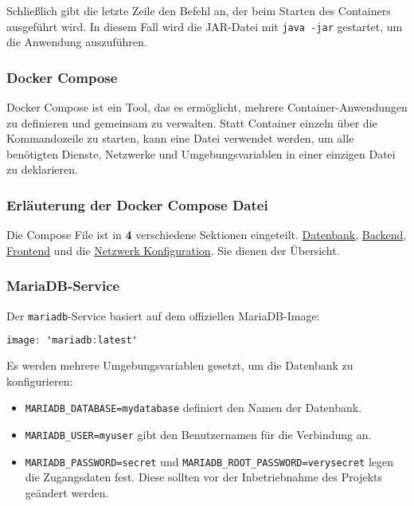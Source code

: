 	\noindent Schließlich gibt die letzte Zeile den Befehl an, der beim Starten des Containers ausgeführt wird. In diesem Fall wird die JAR-Datei mit \texttt{java -jar} gestartet, um die Anwendung auszuführen.
	
	\newpage
	\subsubsection{Docker Compose}
	
	Docker Compose ist ein Tool, das es ermöglicht, mehrere Container-Anwendungen zu definieren und gemeinsam zu verwalten. Statt Container einzeln über die Kommandozeile zu starten, kann eine Datei verwendet werden, um alle benötigten Dienste, Netzwerke und Umgebungsvariablen in einer einzigen Datei zu deklarieren.
	
	\subsubsection{Erläuterung der Docker Compose Datei}
	
	Die Compose File ist in \textbf{4} verschiedene Sektionen eingeteilt. 
	\hyperref[sec:datenbank]{Datenbank}, \hyperref[sec:backend]{Backend}, \hyperref[sec:frontend]{Frontend} und die \hyperref[sec:netzwerk]{Netzwerk Konfiguration}. Sie dienen der Übersicht.
	
	\subsubsection{MariaDB-Service}
	\label{sec:datenbank}
	Der \texttt{mariadb}-Service basiert auf dem offiziellen MariaDB-Image:
	
	\begin{lstlisting}[language=Java]
image: 'mariadb:latest'
	\end{lstlisting}
	
	\noindent Es werden mehrere Umgebungsvariablen gesetzt, um die Datenbank zu konfigurieren:
	
	\begin{itemize}
		\item \texttt{MARIADB\_DATABASE=mydatabase} definiert den Namen der Datenbank.
		\item \texttt{MARIADB\_USER=myuser} gibt den Benutzernamen für die Verbindung an.
		\item \texttt{MARIADB\_PASSWORD=secret} und \texttt{MARIADB\_ROOT\_PASSWORD=verysecret} legen die Zugangsdaten fest. Diese sollten vor der Inbetriebnahme des Projekts geändert werden.
	\end{itemize}
	
